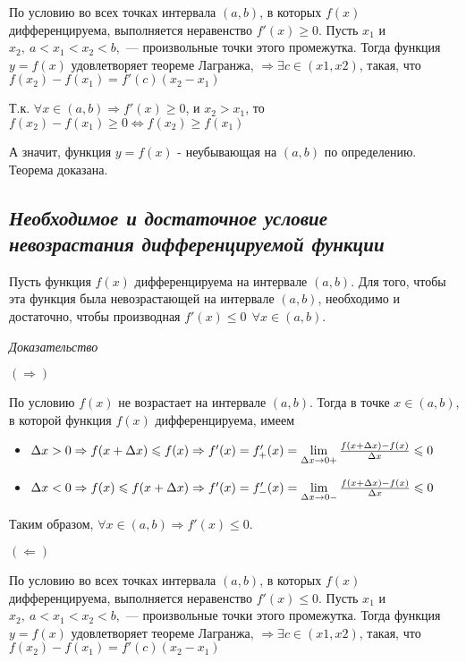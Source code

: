 По условию во всех точках интервала $(a,b)$, в которых $f(x)$ дифференцируема, выполняется неравенство $f'(x) \geqslant 0$. Пусть $x_1$ и $x_2,\ a < x_1 < x_2 < b,$ — произвольные точки этого промежутка. Тогда функция $y = f(x)$ удовлетворяет теореме Лагранжа, $\Rightarrow  \exists c \in (x1, x2)$, такая, что $f(x_2) - f(x_1) = f'(c)(x_2 - x_1)$

Т.к. $\forall x \in (a, b) \Rightarrow f'(x) \geqslant 0$, и $x_2 > x_1$, то $f(x_2) - f(x_1) \geqslant 0 \iff f(x_2) \geqslant  f(x_1) $

А значит, функция $y = f(x)$ - неубывающая на $(a, b)$ по определению. Теорема доказана.
\subsection{\textit{Необходимое и достаточное условие невозрастания дифференцируемой функции}}

Пусть функция $f(x)$ дифференцируема на интервале $(a, b)$. Для того, чтобы эта функция была невозрастающей на интервале $(a, b)$, необходимо и достаточно, чтобы производная $f'(x) \leqslant 0 \ \ \forall x \in (a, b).$

\textit{Доказательство}

$(\Rightarrow)$

По условию $f(x)$ не возрастает на интервале $(a, b)$. Тогда в точке $x \in (a, b)$, в которой функция $f(x)$ дифференцируема, имеем
\begin{itemize}

\item $\Delta x > 0\Rightarrow
f(x + \Delta x) \leqslant f(x)
\Rightarrow f'(x) = f'_+(x) = \lim\limits_{\Delta x \to 0+ }{\Large\frac{f(x + \Delta x) - f(x)}{\Delta x}} \leqslant 0$
\item $\Delta x < 0\Rightarrow f(x) \leqslant f(x + \Delta x) \Rightarrow f'(x) = f'_-(x) = \lim\limits_{\Delta x \to 0-}{\Large\frac{f(x + \Delta x) - f(x)}{\Delta x}} \leqslant 0$

\end{itemize}

Таким образом, $\forall x \in (a, b) \Rightarrow f'(x) \leqslant 0$.

$(\Leftarrow)$

По условию во всех точках интервала $(a,b)$, в которых $f(x)$ дифференцируема, выполняется неравенство $f'(x) \leqslant 0$. Пусть $x_1$ и $x_2,\ a < x_1 < x_2 < b,$ — произвольные точки этого промежутка. Тогда функция $y = f(x)$ удовлетворяет теореме Лагранжа, $\Rightarrow  \exists c \in (x1, x2)$, такая, что $f(x_2) - f(x_1) = f'(c)(x_2 - x_1)$

